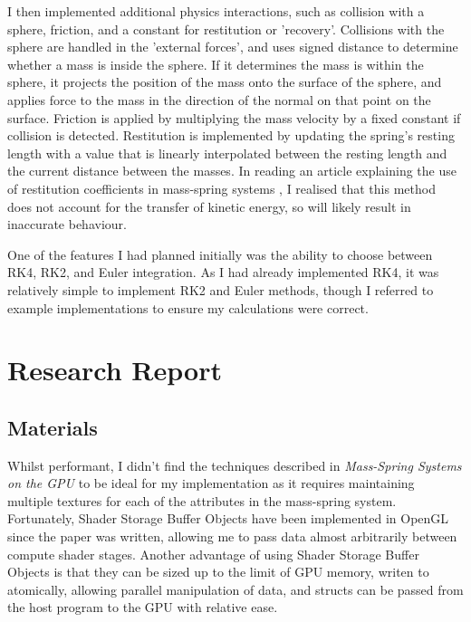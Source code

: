 \documentclass[]{acmsiggraph}
\begin{document}
I then implemented additional physics interactions, such as collision with a sphere, friction, and a constant for restitution or 'recovery'. Collisions with the sphere are handled in the 'external forces', and uses signed distance to determine whether a mass is inside the sphere. If it determines the mass is within the sphere, it projects the position of the mass onto the surface of the sphere, and applies force to the mass in the direction of the normal on that point on the surface. Friction is applied by multiplying the mass velocity by a fixed constant if collision is detected. Restitution is implemented by updating the spring's resting length with a value that is linearly interpolated between the resting length and the current distance between the masses. In reading an article explaining the use of restitution coefficients in mass-spring systems \cite{restitution}, I realised that this method does not account for the transfer of kinetic energy, so will likely result in inaccurate behaviour.

One of the features I had planned initially was the ability to choose between RK4, RK2, and Euler integration. As I had already implemented RK4, it was relatively simple to implement RK2 and Euler methods, though I referred to example implementations \cite{integrators} to ensure my calculations were correct.

\section{Research Report} \label{sec:report}

\subsection{Materials}

Whilst performant, I didn't find the techniques described in \textit{Mass-Spring Systems on the GPU} \cite{massSpringGPU} to be ideal for my implementation as it requires maintaining multiple textures for each of the attributes in the mass-spring system. Fortunately, Shader Storage Buffer Objects have been implemented in OpenGL since the paper was written, allowing me to pass data almost arbitrarily between compute shader stages. Another advantage of using Shader Storage Buffer Objects is that they can be sized up to the limit of GPU memory, writen to atomically, allowing parallel manipulation of data, and structs can be passed from the host program to the GPU with relative ease.
\end{document}
